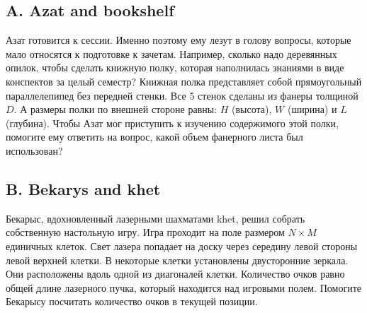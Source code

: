 \subsection*{A. Azat and bookshelf}
 

Азат готовится к сессии. Именно поэтому ему лезут в голову вопросы, которые мало относятся к подготовке к зачетам. Например, сколько надо деревянных опилок, чтобы сделать книжную полку, которая наполнилась знаниями в виде конспектов за целый семестр? Книжная полка  представляет собой прямоугольный параллелепипед без передней стенки. Все 5 стенок сделаны из фанеры толщиной $D$. А размеры полки по внешней стороне равны: $H$ (высота), $W$ (ширина) и  $L$ (глубина). Чтобы Азат мог приступить к изучению содержимого этой полки, помогите ему ответить на вопрос, какой объем фанерного листа был использован?






\subsection*{B. Bekarys and khet}

Бекарыс, вдохновленный лазерными шахматами khet, решил собрать собственную настольную игру. Игра проходит на поле размером $N \times M$ единичных клеток. Свет лазера попадает на доску через середину левой стороны левой верхней клетки. В некоторые клетки установлены двусторонние зеркала. Они расположены вдоль одной из диагоналей клетки. Количество очков равно общей длине лазерного пучка, который находится над игровыми полем. Помогите Бекарысу посчитать количество очков в текущей позиции.




